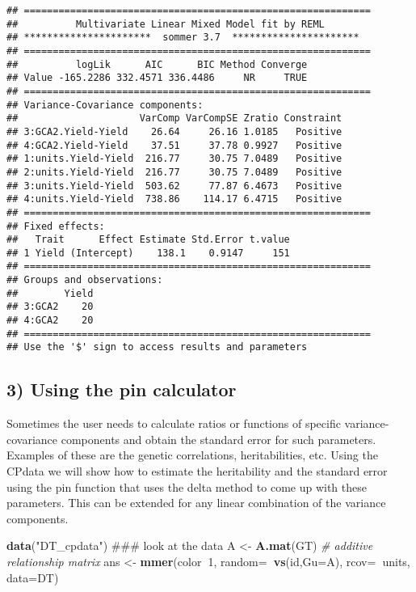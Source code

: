 \documentclass[]{article}
\newenvironment{Shaded}{\begin{snugshade}}{\end{snugshade}}
\newcommand{\KeywordTok}[1]{\textcolor[rgb]{0.13,0.29,0.53}{\textbf{#1}}}
\newcommand{\DataTypeTok}[1]{\textcolor[rgb]{0.13,0.29,0.53}{#1}}
\newcommand{\DecValTok}[1]{\textcolor[rgb]{0.00,0.00,0.81}{#1}}
\newcommand{\StringTok}[1]{\textcolor[rgb]{0.31,0.60,0.02}{#1}}
\newcommand{\CommentTok}[1]{\textcolor[rgb]{0.56,0.35,0.01}{\textit{#1}}}
\newcommand{\OperatorTok}[1]{\textcolor[rgb]{0.81,0.36,0.00}{\textbf{#1}}}
\newcommand{\NormalTok}[1]{#1}
\begin{document}
\begin{verbatim}
## ============================================================
##          Multivariate Linear Mixed Model fit by REML         
## **********************  sommer 3.7  ********************** 
## ============================================================
##          logLik      AIC      BIC Method Converge
## Value -165.2286 332.4571 336.4486     NR     TRUE
## ============================================================
## Variance-Covariance components:
##                     VarComp VarCompSE Zratio Constraint
## 3:GCA2.Yield-Yield    26.64     26.16 1.0185   Positive
## 4:GCA2.Yield-Yield    37.51     37.78 0.9927   Positive
## 1:units.Yield-Yield  216.77     30.75 7.0489   Positive
## 2:units.Yield-Yield  216.77     30.75 7.0489   Positive
## 3:units.Yield-Yield  503.62     77.87 6.4673   Positive
## 4:units.Yield-Yield  738.86    114.17 6.4715   Positive
## ============================================================
## Fixed effects:
##   Trait      Effect Estimate Std.Error t.value
## 1 Yield (Intercept)    138.1    0.9147     151
## ============================================================
## Groups and observations:
##        Yield
## 3:GCA2    20
## 4:GCA2    20
## ============================================================
## Use the '$' sign to access results and parameters
\end{verbatim}

\subsection{3) Using the pin calculator}\label{using-the-pin-calculator}

Sometimes the user needs to calculate ratios or functions of specific
variance-covariance components and obtain the standard error for such
parameters. Examples of these are the genetic correlations,
heritabilities, etc. Using the CPdata we will show how to estimate the
heritability and the standard error using the pin function that uses the
delta method to come up with these parameters. This can be extended for
any linear combination of the variance components.

\begin{Shaded}
\begin{Highlighting}[]
\KeywordTok{data}\NormalTok{(}\StringTok{"DT_cpdata"}\NormalTok{)}
\NormalTok{### look at the data}
\NormalTok{A <-}\StringTok{ }\KeywordTok{A.mat}\NormalTok{(GT) }\CommentTok{# additive relationship matrix}
\NormalTok{ans <-}\StringTok{ }\KeywordTok{mmer}\NormalTok{(color}\OperatorTok{~}\DecValTok{1}\NormalTok{, }
                \DataTypeTok{random=}\OperatorTok{~}\KeywordTok{vs}\NormalTok{(id,}\DataTypeTok{Gu=}\NormalTok{A), }
                \DataTypeTok{rcov=}\OperatorTok{~}\NormalTok{units,}
                \DataTypeTok{data=}\NormalTok{DT)}
\end{Highlighting}
\end{Shaded}
\end{document}
